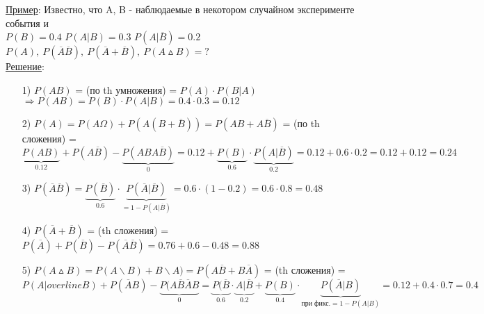 \underline{Пример}: Известно, что A, B - наблюдаемые в некотором случайном эксперименте события и \\
$P(B) = 0.4$ $P(A|B) = 0.3$ $P(A|\overline{B}) = 0.2$ \\
$P(A), \ P(\overline{A} \overline{B}), \ P(\overline{A} + \overline{B}), \ P(A \vartriangle B) = ?$ \\
\underline{Решение}:
\begin{enumerate}
\item[1)] $P(AB)$ = (по th умножения) = $P(A) \cdot P(B|A)$ \\
$\Rightarrow P(AB) = P(B) \cdot P(A|B) = 0.4 \cdot 0.3 = 0.12$ \\

\item[2)] $P(A) = P(A \Omega) + P(A(B + \overline{B})) = P(AB + A\overline{B})$ = (по th сложения) = $\underbrace{P(AB)}_{0.12} + P(A \overline{B}) - \underbrace{P(ABA \overline{B})}_{0} = 0.12 + \underbrace{P(B)}_{0.6} \cdot \underbrace{P(A|\overline{B})}_{0.2} = 0.12 + 0.6 \cdot 0.2 = 0.12 + 0.12 = 0.24$ \\

\item[3)] $P(\overline{A} \overline{B}) = \underbrace{P(\overline{B})}_{0.6} \cdot \underbrace{P(\overline{A}|\overline{B})}_{= 1 - P(A|\overline{B})} = 0.6 \cdot (1 - 0.2) = 0.6 \cdot 0.8 = 0.48$ \\

\item[4)] $P(\overline{A} + \overline{B})$ = (th сложения) = $P(\overline{A}) + P(\overline{B}) - P(\overline{A} \overline{B}) = 0.76 + 0.6 - 0.48 = 0.88$ \\

\item[5)] $P(A \vartriangle B) = P(A \backslash B) + B \backslash A) = P(A\overline{B} + B\overline{A})$ = (th сложения) = $P(A|overline{B}) + P(\overline{A}B) - \underbrace{P(A\overline{B}\overline{A}B}_{0} = 
\underbrace{P(\overline{B}}_{0.6} \cdot \underbrace{A|\overline{B}}_{0.2} + \underbrace{P(B)}_{0.4} \cdot \underbrace{P(\overline{A}|B)}_{\text{при фикс.} = 
1 - P(A|B)} = 0.12 + 0.4 \cdot 0.7 = 0.4$ \\ 
\end{enumerate}

























